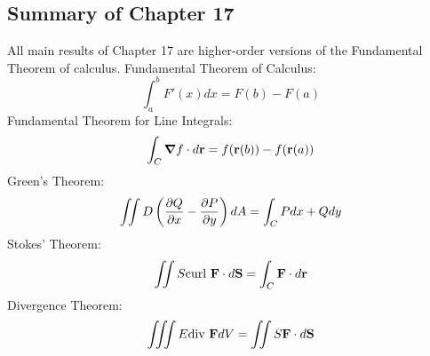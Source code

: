 \documentclass{article}
\begin{document}
    \subsection{Summary of Chapter 17}
    \begin{outline}
        \1 All main results of Chapter 17 are higher-order versions of the Fundamental Theorem of calculus. 
        \1 Fundamental Theorem of Calculus: \[\int^b_aF'(x)dx=F(b)-F(a)\]
        \1 Fundamental Theorem for Line Integrals: \[\int_C\grad f\cdot d\vb r=f(\vb r(b)) - f(\vb r(a))\]
        \1 Green's Theorem: \[\iint\limits D\left(\pdv{Q}{x}-\pdv{P}{y}\right)dA=\int_CPdx+Qdy\]
        \1 Stokes' Theorem: \[\iint\limits S\text{curl }\vb F\cdot d\vb S=\int_C\vb F\cdot d\vb r\]
        \1 Divergence Theorem: \[\iiint\limits E\text{div }\vb FdV=\iint\limits S\vb F\cdot d\vb S\]
    \end{outline}
\end{document}
